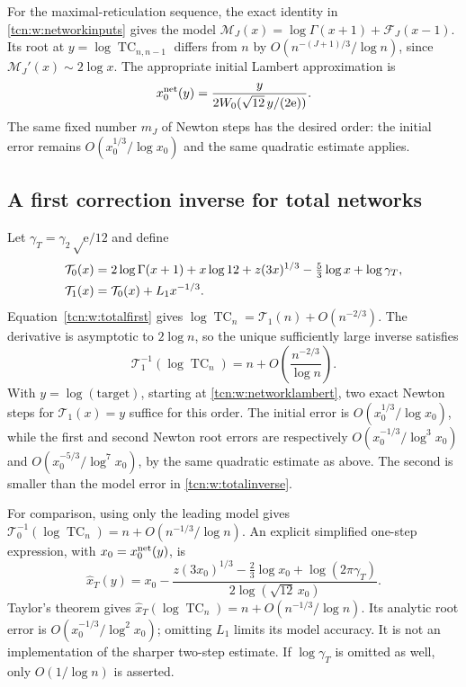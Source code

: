 \documentclass[11pt,letterpaper]{article}
\newcommand{\ee}{\mathrm e}
\newcommand{\TC}{\operatorname{TC}}
\theoremstyle{remark}
\begin{document}
For the maximal-reticulation sequence, the exact identity in \eqref{tcn:w:networkinputs} gives the model
$\mathcal M_J(x)=\log\Gamma(x+1)+\mathcal F_J(x-1)$.
Its root at $y=\log\TC_{n,n-1}$ differs from $n$ by
$O(n^{-(J+1)/3}/\log n)$, since $\mathcal M_J'(x)\sim2\log x$.
The appropriate initial Lambert approximation is
\begin{equation}\label{tcn:w:networklambert}
 x_0^{\rm net}(y)=\frac{y}{2W_0(\sqrt{12}\,y/(2\ee))}.
\end{equation}
The same fixed number $m_J$ of Newton steps has the desired order: the initial error remains $O(x_0^{1/3}/\log x_0)$ and the same quadratic estimate applies.

\subsection{A first correction inverse for total networks}
Let $\gamma_T=\gamma_2\sqrt\ee/12$ and define
\begin{align}
 \mathcal T_0(x)&=2\log\Gamma(x+1)+x\log12+z(3x)^{1/3}
                        -\tfrac53\log x+\log \gamma_T,\notag\\
 \mathcal T_1(x)&=\mathcal T_0(x)+L_1x^{-1/3}.\label{tcn:w:totalmodel}
\end{align}
Equation~\eqref{tcn:w:totalfirst} gives
$\log\TC_n=\mathcal T_1(n)+O(n^{-2/3})$. The derivative is asymptotic to $2\log n$, so the unique sufficiently large inverse satisfies
\begin{equation}\label{tcn:w:totalinverse}
 \mathcal T_1^{-1}(\log\TC_n)=n+O\!\left(\frac{n^{-2/3}}{\log n}\right).
\end{equation}
With $y=\log(\text{target})$, starting at \eqref{tcn:w:networklambert}, two exact Newton steps for $\mathcal T_1(x)=y$ suffice for this order. The initial error is $O(x_0^{1/3}/\log x_0)$, while the first and second Newton root errors are respectively $O(x_0^{-1/3}/\log^3x_0)$ and $O(x_0^{-5/3}/\log^7x_0)$, by the same quadratic estimate as above. The second is smaller than the model error in \eqref{tcn:w:totalinverse}.

For comparison, using only the leading model gives
$\mathcal T_0^{-1}(\log\TC_n)=n+O(n^{-1/3}/\log n)$.
An explicit simplified one-step expression, with $x_0=x_0^{\rm net}(y)$, is
\[
 \hat x_T(y)=x_0-
 \frac{z(3x_0)^{1/3}-\tfrac23\log x_0+\log(2\pi \gamma_T)}
 {2\log(\sqrt{12}\,x_0)}.
\]
Taylor's theorem gives $\hat x_T(\log\TC_n)=n+O(n^{-1/3}/\log n)$. Its analytic root error is $O(x_0^{-1/3}/\log^2x_0)$; omitting $L_1$ limits its model accuracy. It is not an implementation of the sharper two-step estimate. If $\log \gamma_T$ is omitted as well, only $O(1/\log n)$ is asserted.
\end{document}
